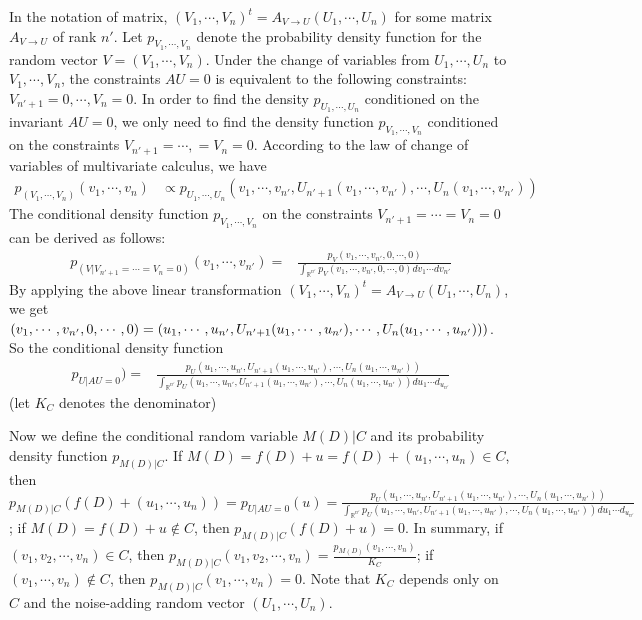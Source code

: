 \documentclass[11pt]{article}
\begin{document}
In the notation of matrix, $(V_1, \cdots, V_n)^t =  A_{V\rightarrow U} (U_1, \cdots, U_n)$ for some matrix $A_{V\rightarrow U}$ of rank $n'$.  Let $p_{V_1, \cdots, V_n}$ denote the probability density function for the random vector $V=(V_1, \cdots, V_n)$.  Under the change of variables from $U_1, \cdots, U_n$ to $V_1, \cdots, V_n$, the constraints  $AU=0$ is equivalent to the following constraints: $V_{n'+1}=0, \cdots, V_n=0$.  In order to find the density $p_{U_1, \cdots, U_n}$ conditioned on the invariant $AU=0$, we only need to find the density function $p_{V_1, \cdots, V_n}$ conditioned on the constraints $V_{n'+1} =\cdots, = V_{n} =0$. 
According to the law of change of variables of multivariate calculus, we have
\begin{align}
    p_{(V_1, \cdots, V_n)} (v_1, \cdots, v_n)  & \propto p_{U_1, \cdots, U_n} (v_1, \cdots, v_{n'}, U_{n'+1} (v_1,\cdots, v_{n'}), \cdots, U_n(v_1, \cdots, v_{n'}))
\end{align}
The conditional density function $p_{V_1, \cdots, V_n}$ on the constraints $V_{n'+1}= \cdots = V_{n}=0$
can be derived as follows:
\begin{align}
   p_{(V|V_{n'+1}=\cdots = V_n=0)} (v_1, \cdots, v_{n'}) = & \frac{p_V(v_1, \cdots, v_{n'}, 0, \cdots, 0)}{\int_{\mathbb{R}^{n'}}p_V(v_1, \cdots, v_{n'}, 0, \cdots, 0) dv_1\cdots dv_{n'}}
\end{align}
By applying the above linear transformation $(V_1, \cdots, V_n)^t =  A_{V\rightarrow U} (U_1, \cdots, U_n)$, we get 
$(v_1, \cdots, v_{n'}, \\ 0, \cdots, 0) = (u_1, \cdots, u_{n'}, U_{n'+1}(u_1, \cdots, u_{n'}), \cdots, U_{n}(u_1, \cdots, u_{n'})))$. So the conditional density function
\begin{align}
  p_{U | AU=0})  = & \frac{p_U(u_1, \cdots, u_{n'}, U_{n'+1}(u_1, \cdots, u_{n'}), \cdots, U_{n}(u_1, \cdots, u_{n'}))}{\int_{\mathbb{R}^{n'}} p_U(u_1, \cdots, u_{n'}, U_{n'+1}(u_1, \cdots, u_{n'}), \cdots, U_{n}(u_1, \cdots, u_{n'})) du_1\cdots d_{u_{n'}}}
\end{align}
(let $K_C$ denotes the denominator)


Now we define the conditional random variable $M(D) |C$ and its probability density function $p_{M(D)|C}$. 
If $M(D) = f(D)+ u = f(D)+(u_1, \cdots, u_n) \in C$, then $p_{M(D)|C} (f(D)+ (u_1, \cdots, u_n)) = 	p_{U|AU=0}(u)=
\frac{p_U(u_1, \cdots, u_{n'}, U_{n'+1}(u_1, \cdots, u_{n'}), \cdots, U_{n}(u_1, \cdots, u_{n'}))}{\int_{\mathbb{R}^{n'}} p_U(u_1, \cdots, u_{n'}, U_{n'+1}(u_1, \cdots, u_{n'}), \cdots, U_{n}(u_1, \cdots, u_{n'})) du_1\cdots d_{u_{n'}}}$; if $M(D) = f(D)+ u \not\in C$, then $p_{M(D)|C} (f(D)+u)=0$.  In summary, if $(v_1, v_2, \cdots, v_n)\in C$, then $p_{M(D)|C} (v_1, v_2, \cdots, v_n) = \frac{p_{M(D)}(v_1, \cdots, v_n)}{K_C}$; if $(v_1, \cdots, v_n)\not\in C$, then $p_{M(D)|C}(v_1, \cdots, v_n) =0$.  Note that $K_C$ depends only on $C$ and the noise-adding random vector $(U_1, \cdots, U_n)$. 
\end{document}
